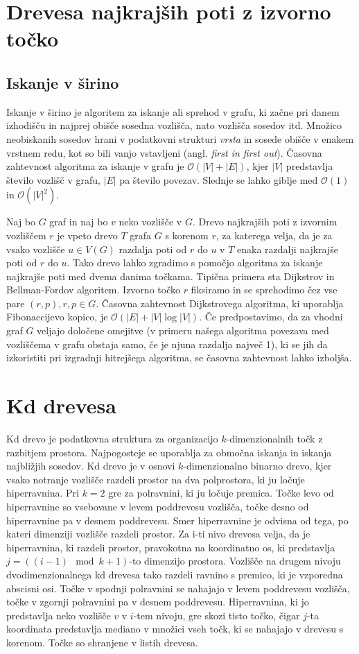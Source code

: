 \documentclass[a4paper, 12pt]{book}
\newcommand{\OO}{\ensuremath{\mathcal{O}}} %
\begin{document}
\section{Drevesa najkrajših poti z izvorno točko}
\subsection*{Iskanje  v širino}
Iskanje v širino je algoritem za iskanje ali sprehod v grafu, ki začne pri danem izhodišču in najprej obišče sosedna vozlišča, nato vozlišča sosedov itd. Množico neobiskanih sosedov hrani v podatkovni strukturi \textit{vrsta} in sosede obišče v enakem vrstnem redu, kot so bili vanjo vstavljeni (angl. \textit{first in first out}). Časovna zahtevnost algoritma za iskanje v grafu je $\OO(|V| + |E|)$, kjer $|V|$ predstavlja število vozlišč v grafu, $|E|$ pa število povezav. Slednje se lahko giblje med $\OO(1)$ in $\OO(|V|^2)$.

\bigbreak
Naj bo $G$ graf in naj bo $v$ neko vozlišče v $G$.
Drevo najkrajših poti z izvornim vozliščem $r$ je vpeto drevo $T$ grafa $G$ s korenom $r$, za katerega velja, da je za vsako vozlišče $u\in V(G)$ razdalja poti od $r$ do $u$ v $T$ enaka razdalji najkrajše poti od $r$ do $u$. Tako drevo lahko zgradimo s pomočjo algoritma za iskanje najkrajše poti med dvema danima točkama. Tipična primera sta Dijkstrov in Bellman-Fordov algoritem. Izvorno točko $r$ fiksiramo in se sprehodimo čez vse pare $(r, p), r,p \in G.$ Časovna zahtevnost Dijkstrovega algoritma, ki uporablja Fibonaccijevo kopico, je $\OO(|E|+|V|\log |V|)$. Če predpostavimo, da za vhodni graf $G$ veljajo določene omejitve (v primeru našega algoritma povezava med vozliščema v grafu obstaja samo, če je njuna razdalja največ 1), ki se jih da izkoristiti pri izgradnji hitrejšega algoritma, se časovna zahtevnost lahko izboljša.

\section{Kd drevesa}

Kd drevo je podatkovna struktura za organizacijo $k$-dimenzionalnih točk z razbitjem prostora. Najpogosteje se uporablja za območna iskanja in iskanja najbližjih sosedov.
Kd drevo je v osnovi $k$-dimenzionalno binarno drevo, kjer vsako notranje vozlišče razdeli prostor na dva polprostora, ki ju ločuje hiperravnina. Pri $k=2$ gre za polravnini, ki ju ločuje premica. Točke levo od hiperravnine so vsebovane v levem poddrevesu vozlišča, točke desno od hiperravnine pa v desnem poddrevesu. Smer hiperravnine je odvisna od tega, po kateri dimenziji vozlišče razdeli prostor.
Za i-ti nivo drevesa velja, da je hiperravnina, ki razdeli prostor, pravokotna na koordinatno os, ki predstavlja $j = ((i-1)\mod k + 1)$-to dimenzijo prostora. Vozlišče na drugem nivoju dvodimenzionalnega kd drevesa tako razdeli
ravnino s premico, ki je vzporedna abscisni osi. Točke v spodnji polravnini se nahajajo v levem poddrevesu vozlišča, točke v zgornji polravnini pa v desnem poddrevesu. Hiperravnina, ki jo predstavlja neko vozlišče $v$ v $i$-tem nivoju,
gre skozi tisto točko, čigar $j$-ta koordinata predstavlja mediano v množici vseh točk, ki se nahajajo v drevesu s korenom. Točke so shranjene v listih drevesa.
\end{document}
